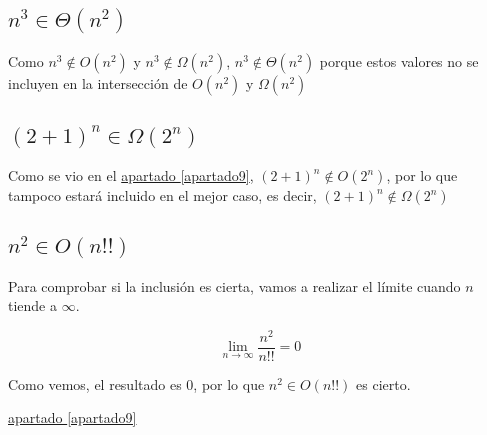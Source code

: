 \begin{twocolumn}

\subsection{$n^3 \in \Theta(n^2)$}


Como $n^3 \notin O(n^2)$ y $n^3 \notin \Omega(n^2)$, $n^3 \notin \Theta(n^2)$ porque estos valores no se incluyen en la intersección de $O(n^2)$ y $\Omega(n^2)$


\subsection{$(2+1)^n \in \Omega(2^n)$}


Como se vio en el \hyperref[apartado9]{apartado \ref*{apartado9}}, $(2+1)^n \notin O(2^n)$, por lo que tampoco estará incluido en el mejor caso, es decir, $(2+1)^n \notin \Omega(2^n)$


\subsection{$n^2 \in O(n!!)$}


Para comprobar si la inclusión es cierta, vamos a realizar el límite cuando $n$ tiende a $\infty$.

\begin{displaymath}
  \lim_{n \rightarrow \infty} \frac{n^2}{n!!} = 0
\end{displaymath}

Como vemos, el resultado es 0, por lo que $n^2 \in O(n!!)$ es cierto.

\end{twocolumn} 
\hyperref[apartado9]{apartado \ref*{apartado9}}